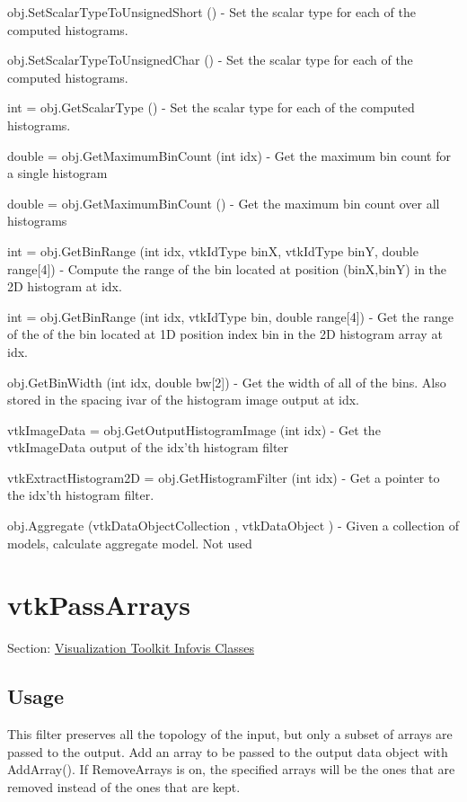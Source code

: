 \begin{DoxyItemize}
\item {\ttfamily obj.\-Set\-Scalar\-Type\-To\-Unsigned\-Short ()} -\/ Set the scalar type for each of the computed histograms.  
\item {\ttfamily obj.\-Set\-Scalar\-Type\-To\-Unsigned\-Char ()} -\/ Set the scalar type for each of the computed histograms.  
\item {\ttfamily int = obj.\-Get\-Scalar\-Type ()} -\/ Set the scalar type for each of the computed histograms.  
\item {\ttfamily double = obj.\-Get\-Maximum\-Bin\-Count (int idx)} -\/ Get the maximum bin count for a single histogram  
\item {\ttfamily double = obj.\-Get\-Maximum\-Bin\-Count ()} -\/ Get the maximum bin count over all histograms  
\item {\ttfamily int = obj.\-Get\-Bin\-Range (int idx, vtk\-Id\-Type bin\-X, vtk\-Id\-Type bin\-Y, double range\mbox{[}4\mbox{]})} -\/ Compute the range of the bin located at position (bin\-X,bin\-Y) in the 2\-D histogram at idx.  
\item {\ttfamily int = obj.\-Get\-Bin\-Range (int idx, vtk\-Id\-Type bin, double range\mbox{[}4\mbox{]})} -\/ Get the range of the of the bin located at 1\-D position index bin in the 2\-D histogram array at idx.  
\item {\ttfamily obj.\-Get\-Bin\-Width (int idx, double bw\mbox{[}2\mbox{]})} -\/ Get the width of all of the bins. Also stored in the spacing ivar of the histogram image output at idx.  
\item {\ttfamily vtk\-Image\-Data = obj.\-Get\-Output\-Histogram\-Image (int idx)} -\/ Get the vtk\-Image\-Data output of the idx'th histogram filter  
\item {\ttfamily vtk\-Extract\-Histogram2\-D = obj.\-Get\-Histogram\-Filter (int idx)} -\/ Get a pointer to the idx'th histogram filter.  
\item {\ttfamily obj.\-Aggregate (vtk\-Data\-Object\-Collection , vtk\-Data\-Object )} -\/ Given a collection of models, calculate aggregate model. Not used  
\end{DoxyItemize}\hypertarget{vtkinfovis_vtkpassarrays}{}\section{vtk\-Pass\-Arrays}\label{vtkinfovis_vtkpassarrays}
Section\-: \hyperlink{sec_vtkinfovis}{Visualization Toolkit Infovis Classes} \hypertarget{vtkwidgets_vtkxyplotwidget_Usage}{}\subsection{Usage}\label{vtkwidgets_vtkxyplotwidget_Usage}
This filter preserves all the topology of the input, but only a subset of arrays are passed to the output. Add an array to be passed to the output data object with Add\-Array(). If Remove\-Arrays is on, the specified arrays will be the ones that are removed instead of the ones that are kept.

